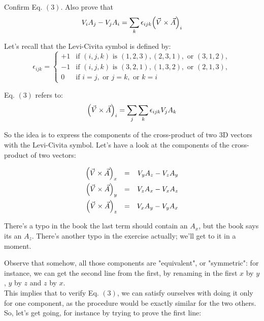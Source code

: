 \documentclass[solutions.tex]{subfiles}
\begin{document}
\maketitle
\begin{exercise}
Confirm Eq. $(3)$. Also prove that
\[
	V_iA_j - V_jA_i = \sum_k \epsilon_{ijk}\Bigl(\vec{V} \times \vec{A}\Bigr)_i
\]
\end{exercise}

Let's recall that the Levi-Civita symbol is defined by:
\[
	\epsilon_{ijk} = \begin{cases}
		+1 & \text{if } (i,j,k) \text{ is } (1,2,3), (2,3,1), \text{ or } (3,1,2), \\
		-1 & \text{if } (i,j,k) \text{ is } (3,2,1), (1,3,2), \text{ or } (2,1,3), \\
		 0 & \text{if } i = j, \text{ or } j = k, \text{ or } k = i
\end{cases}
\]

Eq. $(3)$ refers to:
\[
	\Bigl(\vec{V} \times \vec{A}\Bigr)_i = \sum_j\sum_k\epsilon_{ijk}V_jA_k
\]

So the idea is to express the components of the cross-product of
two $3$D vectors with the Levi-Civita symbol. Let's have a look at
the components of the cross-product of two vectors:

\begin{equation*}\begin{aligned}
	\Bigl(\vec{V}\times\vec{A}\Bigr)_x &&=&& V_yA_z - V_zA_y \\
	\Bigl(\vec{V}\times\vec{A}\Bigr)_y &&=&& V_zA_x - V_xA_z \\
	\Bigl(\vec{V}\times\vec{A}\Bigr)_z &&=&& V_xA_y - V_yA_x \\
\end{aligned}\end{equation*}

\begin{remark} There's a typo in the book the last term should
contain an $A_x$, but the book says its an $A_z$. There's another
typo in the exercise actually; we'll get to it in a moment.
\end{remark}

Observe that somehow, all those components are "equivalent", or
"symmetric": for instance, we can get the second line from the
first, by renaming in the first $x$ by $y$, $y$ by $z$ and $z$ by
$x$. \\

This implies that to verify Eq. $(3)$, we can satisfy ourselves with
doing it only for one component, as the procedure would be exactly
similar for the two others. So, let's get going, for instance by
trying to prove the first line:
\end{document}
